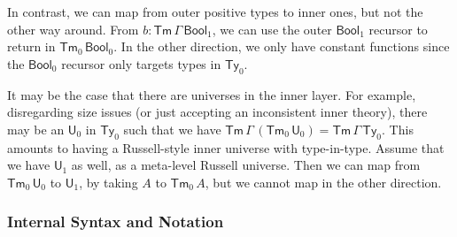 \documentclass[12pt,a4paper,twoside,openany]{book}
\theoremstyle{remark}
\theoremstyle{definition}
\newcommand{\ms}[1]{\mathsf{#1}}
\newcommand{\Tm}{\mathsf{Tm}}
\newcommand{\Ty}{\mathsf{Ty}}
\newcommand{\U}{\mathsf{U}}
\newcommand{\Bool}{\ms{Bool}}
\begin{document}
In contrast, we can map from outer positive types to inner ones, but not the
other way around. From $b : \Tm\,\Gamma\,\Bool_1$, we can use the outer
$\Bool_1$ recursor to return in $\Tm_0\,\Bool_0$. In the other direction, we
only have constant functions since the $\Bool_0$ recursor only targets types in
$\Ty_0$.

It may be the case that there are universes in the inner layer. For example,
disregarding size issues (or just accepting an inconsistent inner theory), there
may be an $\U_0$ in $\Ty_0$ such that we have $\Tm\,\Gamma\,(\Tm_0\,\U_0) =
\Tm\,\Gamma\,\Ty_0$. This amounts to having a Russell-style inner universe with
type-in-type. Assume that we have $\U_1$ as well, as a meta-level Russell
universe. Then we can map from $\Tm_0\,\U_0$ to $\U_1$, by taking $A$ to
$\Tm_0\,A$, but we cannot map in the other direction.

\subsubsection{Internal Syntax and Notation}
\end{document}
